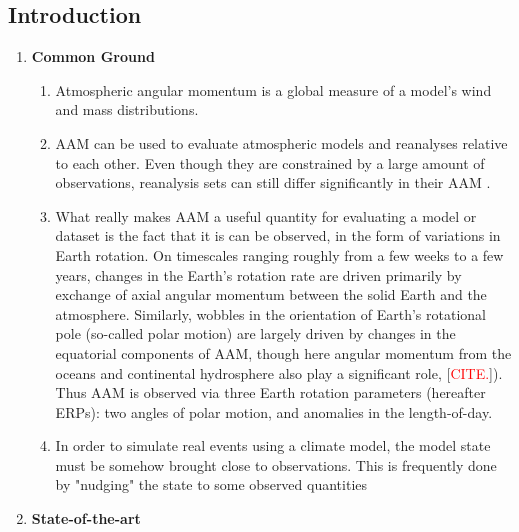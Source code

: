 \documentclass[draft,jgrga]{agutex}
\begin{document}
\begin{article}

%
%
\newcommand{\degree}{\ensuremath{^\circ}}


%
%

\section{Introduction}
\begin{enumerate}
\item \textbf{Common Ground}
\begin{enumerate}
\item Atmospheric angular momentum is a global measure of a model's wind and mass distributions.
\item AAM can be used to evaluate atmospheric models and reanalyses relative to each other. Even though they are constrained by a large amount of observations, reanalysis sets can still differ significantly in their AAM \citep{lehmannnevir2012}.
\item What really makes AAM a useful quantity for evaluating a model or dataset is the fact that it is can be observed, in the form of variations in Earth rotation.  On timescales ranging roughly from a few weeks to a few years, changes in the Earth's rotation rate are driven primarily by exchange of axial angular momentum between the solid Earth and the atmosphere.  Similarly, wobbles in the orientation of Earth's rotational pole (so-called polar motion) are largely driven by changes in the equatorial components of AAM, though here angular momentum from the oceans and continental hydrosphere also play a significant role, [\textcolor{red}{CITE.}]).  Thus AAM is observed via three  Earth rotation parameters (hereafter ERPs): two angles of polar motion, and anomalies in the length-of-day. 
\item In order to simulate real events using a climate model, the model state must be somehow brought close to observations.  This is frequently done by "nudging" the state to some observed quantities
\end{enumerate}
%
\item \textbf{State-of-the-art}
\begin{itemize}

\end{itemize}
\end{enumerate}
\end{article}
\end{document}

